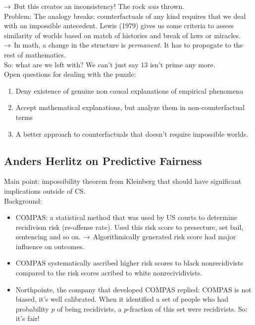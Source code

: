 $\rightarrow$ But this creates an inconsistency! The rock {\it was} thrown. \\

Problem: The analogy breaks: counterfactuals of any kind requires that we deal with an impossible antecedent. Lewis (1979) gives us some criteria to assess similarity of worlds based on match of histories and break of laws or miracles. \\

$\rightarrow$ In math, a change in the structure is {\it permanent}. It has to propogate to the rest of mathematics. \\

So: what are we left with? We can't just say 13 isn't prime any more. \\

Open questions for dealing with the puzzle:
\begin{enumerate}
	\item Deny existence of genuine non causal explanations of empirical phenomena
	\item Accept mathematical explanations, but analyze them in non-counterfactual terms
	\item A better approach to counterfactuals that doesn't require impossible worlds.
\end{enumerate}


\spacerule

\subsection{Anders Herlitz on Predictive Fairness}

Main point: impossibility theorem from Kleinberg that should have significant implications outside of CS. \\

Background:
\begin{itemize}
\item COMPAS: a statistical method that was used by US courts to determine recidivism risk (re-offense rate). Used this risk score to presecture, set bail, sentencing and so on.
$\rightarrow$ Algorithmically generated risk score had major influence on outcomes.
\item COMPAS systematically ascribed higher risk scores to black nonrecidivists compared to the risk scores acribed to white nonrecividivists.
\item Northpointe, the company that developed COMPAS replied: COMPAS is not biased, it's well calibrated. When it identified a set of people who had probability $p$ of being recidivists, a $p$-fraction of this set were recidivists. So: it's fair!
\end{itemize}

